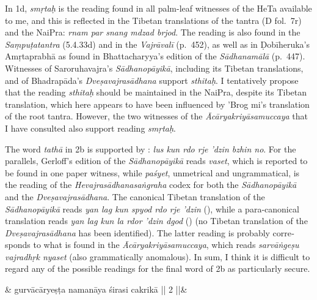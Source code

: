 \documentclass[naipra.tex]{subfiles}
\begin{document}
\begin{sanskrit}
{\begin{english}
		In 1d, \emph{smṛtaḥ} is the reading found in all palm-leaf witnesses of the HeTa available to me, and this is reflected in the Tibetan translations of the tantra (D fol.\ 7r) and the NaiPra: \emph{rnam par snang mdzad brjod}.
		The reading is also found in the \emph{Saṃpuṭatantra} (5.4.33d) and in the \emph{Vajrāvalī} (p.\ 452), as well as in Ḍobīheruka's {Amṛtaprabhā} as found in Bhattacharyya's edition of the \emph{Sādhanamālā} (p.\ 447).
		Witnesses of Saroruhavajra's \emph{Sādhanopāyikā}, including its Tibetan translations, and of Bhadrapāda's \emph{Dveṣavajrasādhana} support \emph{sthitaḥ}.
		I tentatively propose that the reading \emph{sthitaḥ} should be maintained in the NaiPra, despite its Tibetan translation, which here appears to have been influenced by 'Brog mi's translation of the root tantra.
		However, the two witnesses of the \emph{Ācāryakriyāsamuccaya} that I have consulted also support reading \emph{smṛtaḥ}.

		The word \emph{tathā} in 2b is supported by \TIB : \emph{lus kun rdo rje 'dzin bzhin no}.
		For the parallels, Gerloff's edition of the \emph{Sādhanopāyikā} reads \emph{vaset}, which is reported to be found in one paper witness, while \emph{paśyet}, unmetrical and ungrammatical, is the reading of the \emph{Hevajrasādhanasaṅgraha} codex for both the \emph{Sādhanopāyikā} and the \emph{Dveṣavajrasādhana}.
		The canonical Tibetan translation of the \emph{Sādhanopāyikā} reads \emph{yan lag kun spyod rdo rje 'dzin} (\cite[vol.\ 1 135]{gerloff2020}), while a para-canonical translation reads \emph{yan lag kun la rdor 'dzin dgod} (\cite[vol.\ 2 152]{gerloff2020}) (no Tibetan translation of the \emph{Dveṣavajrasādhana} has been identified).
		The latter reading is probably corresponds to what is found in the \emph{Ācāryakriyāsamuccaya}, which reads \emph{sarvāṅgeṣu vajradhṛk nyaset} (also grammatically anomalous).
		In sum, I think it is difficult to regard any of the possible readings for the final word of 2b as particularly secure.
		\label{2bnote}
	\end{english}
} & 
gurvācāryeṣṭa namanāya śirasi cakrikā || 2 ||\&



\end{sanskrit}
\end{document}
